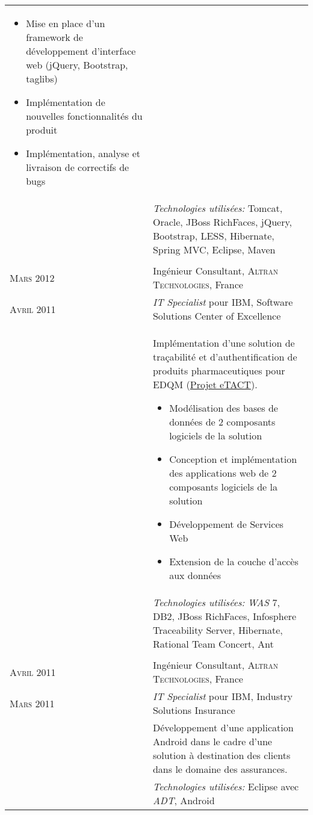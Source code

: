 \begin{longtable}{R{2.5cm}|p{14.8cm}}
{\begin{itemize}
      \item Mise en place d'un framework de développement d'interface web (jQuery, Bootstrap, taglibs)
      \item Implémentation de nouvelles fonctionnalités du produit
      \item Implémentation, analyse et livraison de correctifs de bugs
    \end{itemize}
    \vspace{-1em}
  }\\&
 	\footnotesize{\emph{Technologies utilisées:} Tomcat, Oracle, JBoss RichFaces, jQuery, Bootstrap, LESS, Hibernate, Spring MVC, Eclipse, Maven }\\
  \\
 	\textsc{Mars 2012} & Ingénieur Consultant, \textsc{Altran Technologies}, France\\
 	\textsc{Avril 2011}& \emph{IT Specialist} pour IBM, Software Solutions Center of Excellence\\&
 	\footnotesize{
 		Implémentation d'une solution de traçabilité et d'authentification
 	 	de produits pharmaceutiques pour EDQM (\href{https://www.edqm.eu/fr/eTACT-1466.html}{Projet eTACT}).
 		\begin{itemize}
			\item Modélisation des bases de données de 2 composants logiciels de la solution
			\item Conception et implémentation des applications web de 2 composants logiciels de la solution
			\item Développement de Services Web
			\item Extension de la couche d'accès aux données
		\end{itemize}
		\vspace{-1em}
	}\\&
 	\footnotesize{\emph{Technologies utilisées:} \emph{WAS} 7, DB2, JBoss RichFaces, Infosphere Traceability Server, Hibernate, Rational Team Concert, Ant}\\
  \\
 	\textsc{Avril 2011} & Ingénieur Consultant, \textsc{Altran Technologies}, France\\
 	\textsc{Mars 2011}& \emph{IT Specialist} pour IBM, Industry Solutions Insurance\\&
 	\footnotesize{Développement d'une application Android dans le cadre d'une solution à destination 
 	des clients dans le domaine des assurances.}\\&
 	\footnotesize{\emph{Technologies utilisées:} Eclipse avec \emph{ADT}, Android}\\

\end{longtable}
